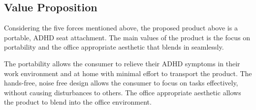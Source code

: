 \documentclass{article}
\begin{document}
    \subsection{Value Proposition}
    Considering the five forces mentioned above, the proposed product above is a portable, ADHD seat attachment. The main values of the product is the focus on portability and the office appropriate aesthetic that blends in seamlessly. 

    The portability allows the consumer to relieve their ADHD symptoms in their work environment and at home with minimal effort to transport the product. The hands-free, noise free design allows the consumer to focus on tasks effectively, without causing disturbances to others. The office appropriate aesthetic allows the product to blend into the office environment.
\end{document}
